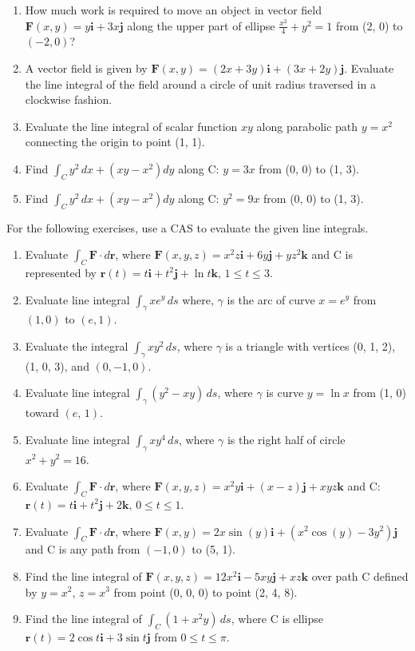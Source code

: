 \documentclass{exercises}
\begin{document}
\begin{enumerate}[resume]
\item How much work is required to move an object in vector field $\mathbf{F}(x,y)=y\mathbf{i}+3x\mathbf{j}$ along the upper part of ellipse $\frac{x^{2}}{4}+y^{2}=1$ from (2, 0) to $(-2,0)$?
\item A vector field is given by $\mathbf{F}(x,y)=(2x+3y)\mathbf{i}+(3x+2y)\mathbf{j}$. Evaluate the line integral of the field around a circle of unit radius traversed in a clockwise fashion.
\item Evaluate the line integral of scalar function $xy$ along parabolic path $y=x^{2}$ connecting the origin to point (1, 1).
\item Find $\int_{C}^{}y^{2}\,dx+(xy-x^{2})dy$ along C: $y=3x$ from (0, 0) to (1, 3).
\item Find $\int_{C}^{}y^{2}\,dx+(xy-x^{2})dy$ along C: $y^{2}=9x$ from (0, 0) to (1, 3).
\end{enumerate}

For the following exercises, use a CAS to evaluate the given line integrals.

\begin{enumerate}[resume]
\item \techrequired Evaluate $\int_{C}^{}\mathbf{F}\cdot d\mathbf{r}$, where $\mathbf{F}(x,y,z)=x^{2}z\mathbf{i}+6y\mathbf{j}+yz^{2}\mathbf{k}$ and C is represented by $\mathbf{r}(t)=t\mathbf{i}+t^{2}\mathbf{j}+\ln t\mathbf{k},\,1\le t\le3$.
\item \techrequired Evaluate line integral $\int_{\gamma}^{}xe^{y}\,ds$ where, $\gamma$ is the arc of curve $x=e^{y}$ from $(1,0)$ to $(e,1)$.
\item \techrequired Evaluate the integral $\int_{\gamma}^{}xy^{2}\,ds$, where $\gamma$ is a triangle with vertices (0, 1, 2), (1, 0, 3), and $(0,-1,0)$.
\item \techrequired Evaluate line integral $\int_{\gamma}^{}(y^{2}-xy)\,ds$, where $\gamma$ is curve $y=\ln x$ from (1, 0) toward $(e,\,1)$.
\item \techrequired Evaluate line integral $\int_{\gamma}^{}xy^{4}\,ds$, where $\gamma$ is the right half of circle $x^{2}+y^{2}=16$.
\item \techrequired Evaluate $\int_{C}^{}\mathbf{F}\cdot d\mathbf{r}$, where $\mathbf{F}(x,y,z)=x^{2}y\mathbf{i}+(x-z)\mathbf{j}+xyz\mathbf{k}$ and C: $\mathbf{r}(t)=t\mathbf{i}+t^{2}\mathbf{j}+2\mathbf{k},\,0\le t\le1$.
\item Evaluate $\int_{C}^{}\mathbf{F}\cdot d\mathbf{r}$, where $\mathbf{F}(x,y)=2x\sin(y)\mathbf{i}+(x^{2}\cos(y)-3y^{2})\mathbf{j}$ and C is any path from $(-1,0)$ to (5, 1).
\item Find the line integral of $\mathbf{F}(x,y,z)=12x^{2}\mathbf{i}-5xy\mathbf{j}+xz\mathbf{k}$ over path C defined by $y=x^{2}$, $z=x^{3}$ from point (0, 0, 0) to point (2, 4, 8).
\item Find the line integral of $\int_{C}^{}(1+x^{2}y)\,ds$, where C is ellipse $\mathbf{r}(t)=2\cos t\mathbf{i}+3\sin t\mathbf{j}$ from $0\le t\le \pi$.
\end{enumerate}
\end{document}
